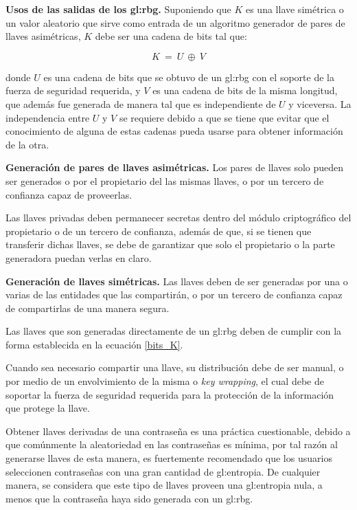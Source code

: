 \textbf{Usos de las salidas de los \gls{gl:rbg}.}
Suponiendo que $K$ es una llave simétrica o un valor aleatorio que sirve 
como entrada de un algoritmo generador de pares de llaves asimétricas, $K$ 
debe ser una cadena de bits tal que: 

\begin{equation}
  \label{bits_K}
  K\: =\: U\: \oplus\: V
\end{equation}

donde $U$ es una cadena de bits que se obtuvo de un \gls{gl:rbg} con el 
soporte de la fuerza de seguridad requerida, y $V$ es una cadena de bits de la 
misma longitud, que además fue generada de manera tal que es independiente de 
$U$ y viceversa. La independencia entre $U$ y $V$ se requiere debido a que se 
tiene que evitar que el conocimiento de alguna de estas cadenas pueda usarse 
para obtener información de la otra.

\textbf{Generación de pares de llaves asimétricas.}
Los pares de llaves solo pueden ser generados o por el propietario del las 
mismas llaves, o por un tercero de confianza capaz de proveerlas.

Las llaves privadas deben permanecer secretas dentro del módulo criptográfico 
del propietario o de un tercero de confianza, además de que, si se tienen que 
transferir dichas llaves, se debe de garantizar que solo el propietario o la 
parte generadora puedan verlas en claro.

\textbf{Generación de llaves simétricas.}
Las llaves deben de ser generadas por una o varias de las entidades que 
las compartirán, o por un tercero de confianza capaz de compartirlas de una 
manera segura. 

Las llaves que son generadas directamente de un \gls{gl:rbg} deben de cumplir 
con la forma establecida en la ecuación \ref{bits_K}.

Cuando sea necesario compartir una llave, su distribución debe de ser manual, 
o por medio de un envolvimiento de la misma o \textit{key wrapping}, el cual 
debe de soportar la fuerza de seguridad requerida para la protección de la 
información que protege la llave.

Obtener llaves derivadas de una contraseña es una práctica cuestionable, 
debido a que comúnmente la aleatoriedad en las contraseñas es mínima, por tal 
razón al generarse llaves de esta manera, es fuertemente recomendado que los 
usuarios seleccionen contraseñas con una gran cantidad de \gls{gl:entropia}. 
De cualquier manera, se considera que este tipo de llaves proveen una 
\gls{gl:entropia} nula, a menos que la contraseña haya sido generada con 
un \gls{gl:rbg}.

